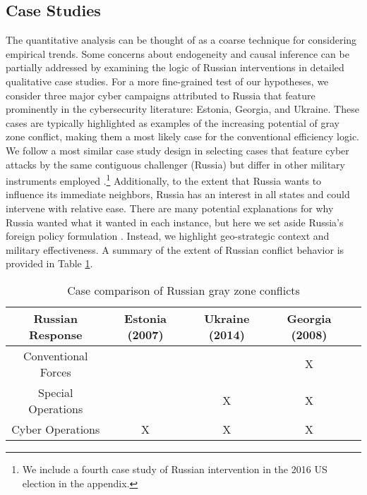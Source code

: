 \documentclass[11pt,letterpaper,pdftex,dvipsnames,table]{article}
\begin{document}
\subsection{Case Studies}
The quantitative analysis can be thought of as a coarse technique for considering empirical trends. Some concerns about endogeneity and causal inference can be partially addressed by examining the logic of Russian interventions in detailed qualitative case studies. For a more fine-grained test of our hypotheses, we consider three major cyber campaigns attributed to Russia that feature prominently in the cybersecurity literature: Estonia, Georgia, and Ukraine. These cases are typically highlighted as examples of the increasing potential of gray zone conflict, making them a most likely case for the conventional efficiency logic. We follow a most similar case study design in selecting cases that feature cyber attacks by the same contiguous challenger (Russia) but differ in other military instruments employed \citep{bennett_casestudymethods_2007}.\footnote{We include a fourth case study of Russian intervention in the 2016 US election in the appendix.} Additionally, to the extent that Russia wants to influence its immediate neighbors, Russia has an interest in all states and could intervene with relative ease. There are many potential explanations for why Russia wanted what it wanted in each instance, but here we set aside Russia's foreign policy formulation \citep{gotz_putinstatewar_2017, mcfaul_putinputinismdomestic_2020}. Instead, we highlight geo-strategic context and military effectiveness. A summary of the extent of Russian conflict behavior is provided in Table \ref{table:russia}.
    
	\begin{table}[h]
		\centering
		\begin{tabular}{|c||c|c|c|c|}
		    \hline
            \textbf{Russian Response} &  Estonia (2007) & Ukraine (2014) & Georgia (2008) \\
			\hline
            Conventional Forces  &  &  &  X  \\
			\hline
            Special Operations  &  & X & X \\
			\hline
			Cyber Operations & X & X & X \\
			\hline
	    \end{tabular}
        \caption{Case comparison of Russian gray zone conflicts}
		\label{table:russia}
	\end{table}
\end{document}
